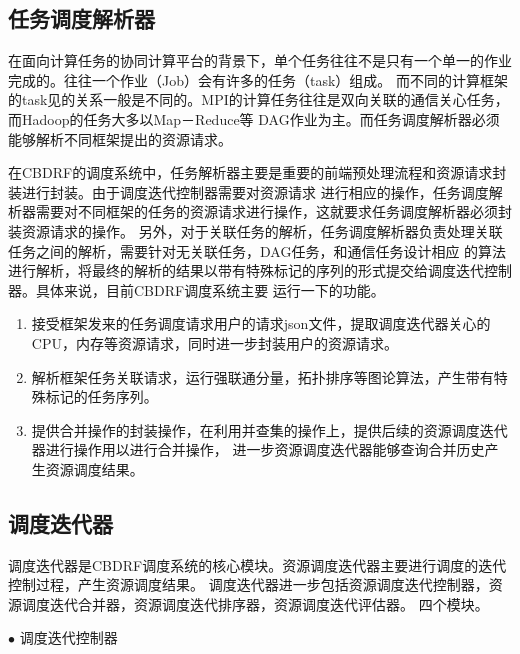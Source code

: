 \subsection{任务调度解析器}
在面向计算任务的协同计算平台的背景下，单个任务往往不是只有一个单一的作业完成的。往往一个作业（Job）会有许多的任务（task）组成。
而不同的计算框架的task见的关系一般是不同的。MPI的计算任务往往是双向关联的通信关心任务，而Hadoop的任务大多以Map－Reduce等
DAG作业为主。而任务调度解析器必须能够解析不同框架提出的资源请求。

在CBDRF的调度系统中，任务解析器主要是重要的前端预处理流程和资源请求封装进行封装。由于调度迭代控制器需要对资源请求
进行相应的操作，任务调度解析器需要对不同框架的任务的资源请求进行操作，这就要求任务调度解析器必须封装资源请求的操作。
另外，对于关联任务的解析，任务调度解析器负责处理关联任务之间的解析，需要针对无关联任务，DAG任务，和通信任务设计相应
的算法进行解析，将最终的解析的结果以带有特殊标记的序列的形式提交给调度迭代控制器。具体来说，目前CBDRF调度系统主要
运行一下的功能。
\begin{enumerate}
\item 接受框架发来的任务调度请求用户的请求json文件，提取调度迭代器关心的CPU，内存等资源请求，同时进一步封装用户的资源请求。
\item 解析框架任务关联请求，运行强联通分量，拓扑排序等图论算法，产生带有特殊标记的任务序列。
\item 提供合并操作的封装操作，在利用并查集的操作上，提供后续的资源调度迭代器进行操作用以进行合并操作，
进一步资源调度迭代器能够查询合并历史产生资源调度结果。
\end{enumerate}

\subsection{调度迭代器}
调度迭代器是CBDRF调度系统的核心模块。资源调度迭代器主要进行调度的迭代控制过程，产生资源调度结果。
调度迭代器进一步包括资源调度迭代控制器，资源调度迭代合并器，资源调度迭代排序器，资源调度迭代评估器。
四个模块。

$\bullet$ 调度迭代控制器

